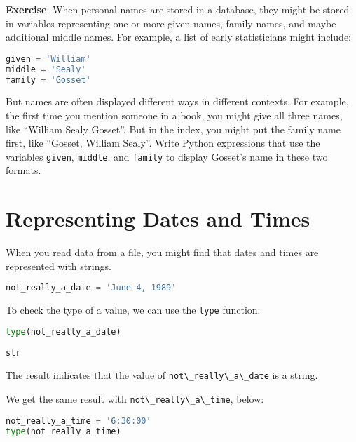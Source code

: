 \textbf{Exercise}: When personal names are stored in a database, they
might be stored in variables representing one or more given names,
family names, and maybe additional middle names. For example, a list of
early statisticians might include:

\begin{lstlisting}[language=Python,style=source]
given = 'William'
middle = 'Sealy'
family = 'Gosset'
\end{lstlisting}

But names are often displayed different ways in different contexts. For
example, the first time you mention someone in a book, you might give
all three names, like ``William Sealy Gosset''. But in the index, you
might put the family name first, like ``Gosset, William Sealy''. Write
Python expressions that use the variables
\passthrough{\lstinline!given!}, \passthrough{\lstinline!middle!}, and
\passthrough{\lstinline!family!} to display Gosset's name in these two
formats.

\section{Representing Dates and
Times}\label{representing-dates-and-times}

When you read data from a file, you might find that dates and times are
represented with strings.

\begin{lstlisting}[language=Python,style=source]
not_really_a_date = 'June 4, 1989'
\end{lstlisting}

\pagebreak

To check the type of a value, we can use the
\passthrough{\lstinline!type!} function.

\begin{lstlisting}[language=Python,style=source]
type(not_really_a_date)
\end{lstlisting}

\begin{lstlisting}[style=output]
str
\end{lstlisting}

The result indicates that the value of
\passthrough{\lstinline!not\_really\_a\_date!} is a string.

We get the same result with
\passthrough{\lstinline!not\_really\_a\_time!}, below:

\begin{lstlisting}[language=Python,style=source]
not_really_a_time = '6:30:00'
type(not_really_a_time)
\end{lstlisting}

